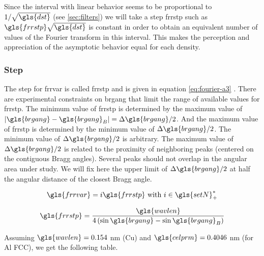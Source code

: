 \medskip

Since the interval with linear behavior seems to be proportional to \( 1 / \sqrt{\gls{dst}} \) (see \ref{sec:filters}) we will take a step \gls{frrstp} such as \( \gls{frrstp} \sqrt{\gls{dst}} \) is constant in order to obtain an equivalent number of values of the Fourier transform in this interval.
This makes the perception and appreciation of the asymptotic behavior equal for each density.

\subsubsection{Step}

The step for \gls{frrvar} is called \gls{frrstp} and is given in equation \eqref{eq:fourier-a3} \cite{W1990}.
There are experimental constraints on \gls{brgang} that limit the range of available values for \gls{frrstp}.
The minimum value of \gls{frrstp} is determined by the maximum value of \( | \gls{brgang} - \gls{brgang}_B | = \Delta \gls{brgang} / 2 \).
And the maximum value of \gls{frrstp} is determined by the minimum value of \( \Delta \gls{brgang} / 2 \).
The minimum value of \( \Delta \gls{brgang} / 2 \) is arbitrary.
The maximum value of \( \Delta \gls{brgang} / 2 \) is related to the proximity of neighboring peaks (centered on the contiguous Bragg angles).
Several peaks should not overlap in the angular area under study.
We will fix here the upper limit of \( \Delta \gls{brgang} / 2 \) at half the angular distance of the closest Bragg angle.

\begin{equation}\label{eq:fourier-L-step}
\gls{frrvar} = i \gls{frrstp} \ \text{with} \ i \in \gls{setN}^*_+
\end{equation}

\begin{equation}\label{eq:fourier-a3}
\gls{frrstp} = \frac{\gls{wavlen}}{4 \left( \sin \gls{brgang} - \sin \gls{brgang}_B \right)}
\end{equation}

\medskip

Assuming \( \gls{wavlen} = 0.154 \) nm (Cu) and \( \gls{celprm} =  0.4046 \) nm  (for Al FCC), we get the following table.

\medskip

